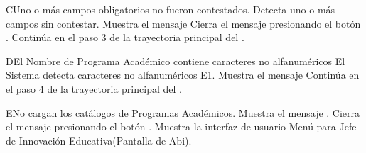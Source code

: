 
\begin{UCtrayectoriaA}{C}{Uno o más campos obligatorios no fueron contestados.}
	\UCpaso Detecta uno o más campos sin contestar.
    \UCpaso Muestra el mensaje 
    \UCpaso[\UCactor] Cierra el mensaje presionando el botón .
    \UCpaso Continúa en el paso 3 de la trayectoria principal del .
\end{UCtrayectoriaA}

\begin{UCtrayectoriaA}{D}{El Nombre de Programa Académico contiene caracteres no alfanuméricos}
	\UCpaso El Sistema detecta caracteres no alfanuméricos E1.
    \UCpaso Muestra el mensaje 
    \UCpaso Continúa en el paso 4 de la trayectoria principal del .
\end{UCtrayectoriaA}

\begin{UCtrayectoriaA}{E}{No cargan los catálogos de Programas Académicos.}
    \UCpaso Muestra el mensaje .
    \UCpaso[\UCactor] Cierra el mensaje presionando el botón .
\UCpaso Muestra la interfaz de usuario Menú para Jefe de Innovación Educativa(Pantalla de Abi).
\end{UCtrayectoriaA}
